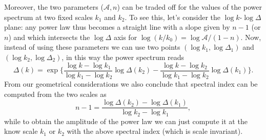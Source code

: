 Moreover, the two parameters ($\mathcal A, n$) can be traded off for the values of the power spectrum at two fixed scales $k_1$ and $k_2$. To see this, let's consider the $\log k$-$\log\Delta$ plane: any power law thus becomes a straight line with a slope given by $n-1$ (or $n$) and which intersects the $\log\Delta$ axis for $\log (k/k_0)=\log\mathcal A/(1-n)$. Now, instead of using these parameters we can use two points $(\log k_1,\log\Delta_1)$ and $(\log k_2,\log\Delta_2)$, in this way the power spectrum reads
\begin{equation}\label{eq:2_scales_PS}
    \Delta(k)=\exp\bigg\{\frac{\log k-\log k_1}{\log k_1 -\log k_2}\log\Delta(k_2)-\frac{\log k-\log k_2}{\log k_1 -\log k_2}\log\Delta(k_1)\bigg\}.
\end{equation}
From our geometrical considerations we also conclude that spectral index can be computed from the two scales as
$$n-1=\frac{\log\Delta(k_2)-\log\Delta(k_1)}{\log k_2-\log k_1},$$
while to obtain the amplitude of the power law we can just compute it at the know scale $k_1$ or $k_2$ with the above spectral index (which is scale invariant).
